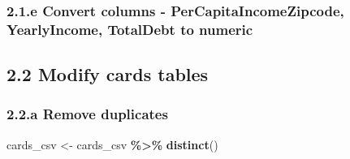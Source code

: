 \documentclass[
]{article}
\newenvironment{Shaded}{\begin{snugshade}}{\end{snugshade}}
\newcommand{\CommentTok}[1]{\textcolor[rgb]{0.56,0.35,0.01}{\textit{#1}}}
\newcommand{\FunctionTok}[1]{\textcolor[rgb]{0.13,0.29,0.53}{\textbf{#1}}}
\newcommand{\NormalTok}[1]{#1}
\newcommand{\OtherTok}[1]{\textcolor[rgb]{0.56,0.35,0.01}{#1}}
\newcommand{\SpecialCharTok}[1]{\textcolor[rgb]{0.81,0.36,0.00}{\textbf{#1}}}
\newcommand{\StringTok}[1]{\textcolor[rgb]{0.31,0.60,0.02}{#1}}
\begin{document}
\subsubsection{2.1.e Convert columns - PerCapitaIncomeZipcode,
YearlyIncome, TotalDebt to
numeric}\label{e-convert-columns---percapitaincomezipcode-yearlyincome-totaldebt-to-numeric}

\begin{Shaded}
\end{Shaded}

\subsection{2.2 Modify cards tables}\label{modify-cards-tables}

\subsubsection{2.2.a Remove duplicates}\label{a-remove-duplicates}

\begin{Shaded}
\begin{Highlighting}[]
\NormalTok{cards\_csv }\OtherTok{\textless{}{-}}\NormalTok{ cards\_csv }\SpecialCharTok{\%\textgreater{}\%} \FunctionTok{distinct}\NormalTok{() }
\end{Highlighting}
\end{Shaded}
\end{document}
